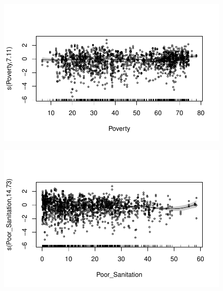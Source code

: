 \documentclass[
  letterpaper,
  DIV=11,
  numbers=noendperiod]{scrartcl}
\begin{document}
\begin{figure}[H]

{\centering \includegraphics{Group34Coursework_files/figure-pdf/unnamed-chunk-15-5.pdf}

}

\end{figure}

\begin{figure}[H]

{\centering \includegraphics{Group34Coursework_files/figure-pdf/unnamed-chunk-15-6.pdf}

}

\end{figure}
\end{document}
